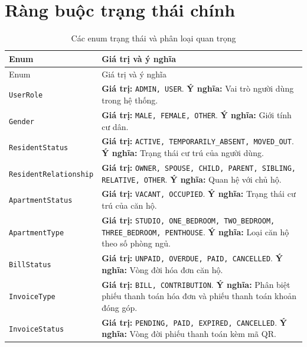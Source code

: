 ﻿\documentclass[12pt,a4paper]{report}
\begin{document}
\section{Ràng buộc trạng thái chính}
\begingroup\scriptsize
\begin{longtable}{L{4.9cm} L{9.5cm}}
\caption{Các enum trạng thái và phân loại quan trọng}\label{tab:enums}\\
\toprule
Enum & Giá trị và ý nghĩa \\
\midrule
\endfirsthead
\toprule Enum & Giá trị và ý nghĩa \\\midrule
\endhead
\texttt{UserRole} & \textbf{Giá trị:} \texttt{ADMIN, USER}. \newline \textbf{Ý nghĩa:} Vai trò người dùng trong hệ thống. \\
\texttt{Gender} & \textbf{Giá trị:} \texttt{MALE, FEMALE, OTHER}. \newline \textbf{Ý nghĩa:} Giới tính cư dân. \\
\texttt{ResidentStatus} & \textbf{Giá trị:} \texttt{ACTIVE, TEMPORARILY\_ABSENT, MOVED\_OUT}. \newline \textbf{Ý nghĩa:} Trạng thái cư trú của người dùng. \\
\texttt{Resident}\newline\texttt{Relationship} & \textbf{Giá trị:} \texttt{OWNER, SPOUSE, CHILD, PARENT, SIBLING, RELATIVE, OTHER}. \newline \textbf{Ý nghĩa:} Quan hệ với chủ hộ. \\
\texttt{ApartmentStatus} & \textbf{Giá trị:} \texttt{VACANT, OCCUPIED}. \newline \textbf{Ý nghĩa:} Trạng thái cư trú của căn hộ. \\
\texttt{ApartmentType} & \textbf{Giá trị:} \texttt{STUDIO, ONE\_BEDROOM, TWO\_BEDROOM, THREE\_BEDROOM, PENTHOUSE}. \newline \textbf{Ý nghĩa:} Loại căn hộ theo số phòng ngủ. \\
\texttt{BillStatus} & \textbf{Giá trị:} \texttt{UNPAID, OVERDUE, PAID, CANCELLED}. \newline \textbf{Ý nghĩa:} Vòng đời hóa đơn căn hộ. \\
\texttt{InvoiceType} & \textbf{Giá trị:} \texttt{BILL, CONTRIBUTION}. \newline \textbf{Ý nghĩa:} Phân biệt phiếu thanh toán hóa đơn và phiếu thanh toán khoản đóng góp. \\
\texttt{InvoiceStatus} & \textbf{Giá trị:} \texttt{PENDING, PAID, EXPIRED, CANCELLED}. \newline \textbf{Ý nghĩa:} Vòng đời phiếu thanh toán kèm mã QR. \\

\end{longtable}
\end{document}
